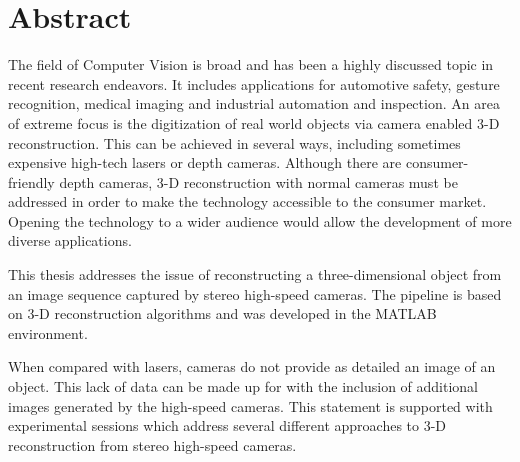 \section*{Abstract}
The field of Computer Vision is broad and has been a highly discussed topic in recent research endeavors. It includes applications for automotive safety, gesture recognition, medical imaging and industrial automation and inspection. An area of extreme focus is the digitization of real world objects via camera enabled 3-D reconstruction. This can be achieved in several ways, including sometimes expensive high-tech lasers or depth cameras. Although there are consumer-friendly depth cameras, 3-D reconstruction with normal cameras must be addressed in order to make the technology accessible to the consumer market. Opening the technology to a wider audience would allow the development of more diverse applications.

This thesis addresses the issue of reconstructing a three-dimensional object from an image sequence captured by stereo high-speed cameras. The pipeline is based on 3-D reconstruction algorithms and was developed in the MATLAB environment. 

When compared with lasers, cameras do not provide as detailed an image of an object. This lack of data can be made up for with the inclusion of additional images generated by the high-speed cameras. This statement is supported with experimental sessions which address several different approaches to 3-D reconstruction from stereo high-speed cameras.